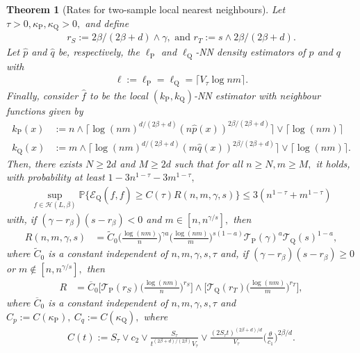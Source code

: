\documentclass[10pt]{article}
\newcommand{\mE}{\mathcal{E}}
\newcommand{\mH}{\mathcal{H}}
\newcommand{\mT}{\mathcal{T}}
\newcommand{\PP}{\mathbb{P}}
\renewcommand{\P}{\operatorname{P}}
\newcommand{\Q}{\operatorname{Q}}
\renewcommand{\k}{\kappa}
\newcommand{\wh}{\widehat}
\newcommand{\ol}{\overline}
\newtheorem{theorem}{Theorem}
\begin{document}
\begin{theorem}[Rates for two-sample local nearest neighbours]
\label{th.rates.local.k.two.sample.proof}
    Let $\tau > 0, \k_{\P}, \k_{\Q} >0,$ and define
    \begin{align*}
        r_S := 2\beta/(2\beta + d) \wedge \gamma,\text{ and }r_T := s\wedge 2\beta/(2\beta + d).
    \end{align*}
    Let $\wh p$ and $\wh q$ be, respectively, the $\ell_{\P}$ and $\ell_{\Q}$-NN density estimators of $p$ and $q$ with
    \begin{align*}
        \ell := \ell_{\P} = \ell_{\Q} = \big\lceil V_\tau\log nm\big\rceil.
    \end{align*}
    Finally, consider $\wh f$ to be the local $(k_{\P}, k_{\Q})$-NN estimator with neighbour functions given by
    \begin{align*}
        k_{\P}(x) &:= n\wedge \Big\lceil \log(nm)^{d/(2\beta + d)}(n\wh p(x))^{2\beta/(2\beta + d)}\Big\rceil \vee \big\lceil \log (nm) \big\rceil\\
        k_{\Q}(x) &:= m\wedge \Big\lceil \log(nm)^{d/(2\beta + d)}(m\wh q(x))^{2\beta/(2\beta + d)}\Big\rceil \vee \big\lceil \log (nm) \big\rceil.
    \end{align*}
    Then, there exists $N \geq 2d$ and $M \geq 2d$ such that for all $n \geq N, m \geq M,$ it holds, with probability at least $1 - 3n^{1-\tau} - 3m^{1-\tau},$
    \begin{align*}
        \sup_{f \in \mH(L, \beta)}\PP\Big\{\mE_{\Q}(\wh f, f) \geq C(\tau)R(n,m, \gamma, s)\Big\} \leq 3(n^{1 - \tau} + m^{1 - \tau})
    \end{align*}
    with, if $(\gamma - r_\beta)(s - r_\beta) <0$ and $m \in [n, n^{\gamma/s}],$ then
    \begin{align*}
        R(n,m, \gamma, s) &= \tilde C_0\Big(\frac{\log(nm)}{n}\Big)^{\gamma a}\Big(\frac{\log(nm)}{m}\Big)^{s(1- a)}\mT_{\P}(\gamma)^{a}\mT_{\Q}(s)^{1-a},
    \end{align*}
    where $\tilde C_0$ is a constant independent of $n,m, \gamma, s, \tau$ and, if $(\gamma - r_\beta)(s - r_\beta) \geq 0$ or $m \notin [n, n^{\gamma/s}],$ then
    \begin{align*}
         R &= \ol C_0\Big[\mT_{\P}(r_S)\Big(\frac{\log(nm)}{n}\Big)^{r_S}\Big]\wedge \Big[\mT_{\Q}(r_T)\Big(\frac{\log(nm)}{m}\Big)^{r_T}\Big],
    \end{align*}
    where $\ol C_0$ is a constant independent of $n,m, \gamma, s, \tau$ and $C_p := C(\k_{\P}), \ C_q := C(\k_{\Q}),$ where
    \begin{align*}
        C(t) := S_\tau\vee c_2 \vee \frac{S_\tau}{t^{(2\beta + d)/(2\beta)}V_\tau} \vee \frac{(2S_\tau t)^{(2\beta + d)/d}}{V_\tau}\bigg(\frac{\theta}{c_1}\bigg)^{2\beta/d}.
    \end{align*}
    
\end{theorem}
\end{document}

